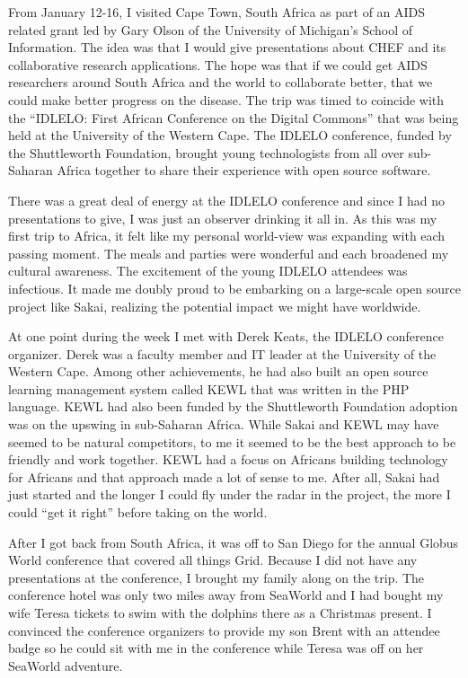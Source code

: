 \documentclass[12pt]{book}
\begin{document}
From January 12-16, I visited Cape Town, South Africa as part of an AIDS related
grant led by Gary Olson of the University of Michigan's School of Information.
The idea was that I would give presentations about CHEF and its collaborative research
applications.  The hope was that if we could get AIDS researchers around South Africa
and the world to
collaborate better, that we could make better progress on the disease.  The trip was
timed to coincide with the ``IDLELO: First African Conference on the Digital Commons''
that was being held at the University of the Western Cape.  The IDLELO
conference, funded by the Shuttleworth Foundation, brought young technologists
from all over sub-Saharan Africa together to share their experience with open source
software.

There was a great deal of energy at the IDLELO conference and since
I had no presentations to give, I was just an observer drinking it all in.
As this was my first trip to Africa, it felt like my personal world-view
was expanding with each passing moment.  The meals and parties were wonderful
and each broadened my cultural awareness.  The excitement of the young IDLELO attendees
was infectious.  It made me doubly proud to be embarking on a large-scale open source
project like Sakai, realizing the potential impact we might have worldwide.

At one point during the week I met with Derek Keats, the
IDLELO conference organizer.  Derek was
a faculty member and IT leader at the University of the Western Cape.  Among other
achievements, he had also built an open source learning management system called KEWL
that was written in the PHP language.  KEWL had also been funded by the Shuttleworth
Foundation adoption was on the upswing in sub-Saharan Africa.
While Sakai and KEWL may have seemed to be natural competitors, to me it seemed to be
the best approach to be friendly and work together.  KEWL had a focus on Africans
building technology for Africans and that approach made a lot of sense to me.
After all, Sakai had just started and the longer I could fly under the radar
in the project, the more I could ``get it right'' before taking on the world.

After I got back from South Africa, it was off to San Diego for the annual
Globus World conference that covered all things Grid.  Because I did not have any
presentations at the conference, I brought my family along on the trip.  The
conference hotel was only two miles away from SeaWorld and I had bought my wife
Teresa tickets to swim with the dolphins there as a Christmas present.
I convinced the conference organizers to provide my son Brent with an attendee badge
so he could sit with me in the conference while Teresa was off on her SeaWorld
adventure.
\end{document}
